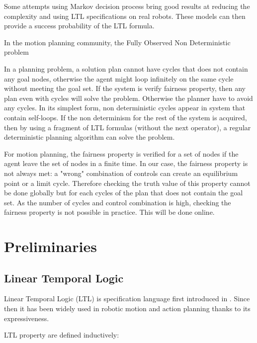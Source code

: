 Some attempts using Markov decision process bring good results at reducing the complexity and using LTL specifications on real robots. These models can then provide a success probability of the LTL formula. 

In the motion planning community, the Fully Observed Non Deterministic problem  

In a planning problem, a solution plan cannot have cycles that does not contain any goal nodes, otherwise the agent might loop infinitely on the same cycle without meeting the goal set. If the system is verify fairness property, then any plan even with cycles will solve the problem. Otherwise the planner have to avoid any cycles.
In its simplest form, non deterministic cycles appear in system that contain self-loops. If the non determinism for the rest of the system is acquired, then by using a fragment of LTL formulas (without the next operator), a regular deterministic planning algorithm can solve the problem.

For motion planning, the fairness property is verified for a set of nodes if the agent leave the set of nodes in a finite time.
In our case, the fairness property is not always met: a "wrong" combination of controls can create an equilibrium point or a limit cycle.
Therefore checking the truth value of this property cannot be done globally but for each cycles of the plan that does not contain the goal set.
As the number of cycles and control combination is high, checking the fairness property is not possible in practice. This will be done online.



\section{Preliminaries}

\subsection{Linear Temporal Logic}
Linear Temporal Logic (LTL) is specification language first introduced in \cite{pnueli1977temporal}. Since then it has been widely used in robotic motion and action planning thanks to its expressiveness.

LTL property are defined inductively:

